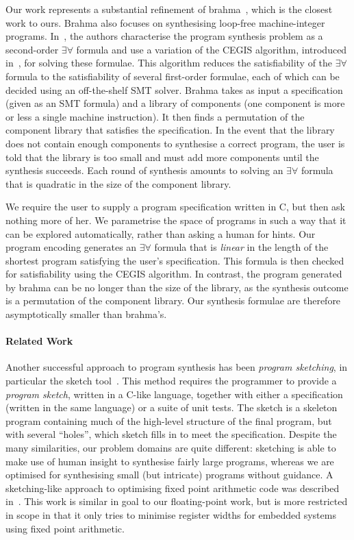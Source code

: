 \documentclass[a4paper]{llncs}
\begin{document}
Our work represents a substantial refinement of {\sc brahma}~\cite{brahma},
which is the closest work to ours.  {\sc Brahma} also focuses on
synthesising loop-free machine-integer programs.  In~\cite{brahma}, the
authors characterise the program synthesis problem as a second-order
$\exists \forall$ formula and use a variation of the CEGIS algorithm,
introduced in~\cite{lezama-thesis}, for solving
these formulae.  This algorithm reduces the satisfiability of the $\exists
\forall$ formula to the satisfiability of several first-order formulae, each
of which can be decided using an off-the-shelf SMT solver.  {\sc Brahma}
takes as input a specification (given as an SMT formula) and a library of
components (one component is more or less a single machine instruction).  It
then finds a permutation of the component library that satisfies the
specification.  In the
event that the library does not contain enough components to synthesise a
correct program, the user is told that the library is too small and
must add more components until the synthesis succeeds.  Each round of
synthesis amounts to solving an $\exists \forall$ formula that is quadratic
in the size of the component library.

We require the user to supply a program specification written in C, but then
ask nothing more of her.  We parametrise the space of programs in such a way
that it can be explored automatically, rather than asking a human for hints.
Our program encoding generates an $\exists
\forall$ formula that is \emph{linear} in the length of the shortest program
satisfying the user's specification.  This formula is then checked for satisfiability
using the CEGIS algorithm.  In contrast, the program generated by {\sc
brahma} can be no longer than the size of the library, as the synthesis
outcome is a permutation of the component library.  Our synthesis
formulae are therefore asymptotically smaller than {\sc brahma}'s.

\paragraph{Related Work}

Another successful approach to program synthesis has been \emph{program
sketching}, in particular the {\sc sketch} tool~\cite{lezama-thesis,sketch,modular-sketch}.  This method
requires the programmer to provide a \emph{program sketch}, written in a
C-like language, together with either a specification (written in the same
language) or a suite of unit tests.  The sketch is a skeleton program
containing much of the high-level structure of the final program, but with
several ``holes'', which {\sc sketch} fills in to meet the specification.
Despite the many similarities, our problem domains are quite different:
sketching is able to make use of human insight to synthesise fairly large
programs, whereas we are optimised for synthesising small (but intricate)
programs without guidance.  A sketching-like approach to optimising
fixed point arithmetic code was described in~\cite{eldib-wang}.  This
work is similar in goal to our floating-point work, but is more restricted
in scope in that it only tries to minimise register widths for embedded
systems using fixed point arithmetic.
\end{document}

